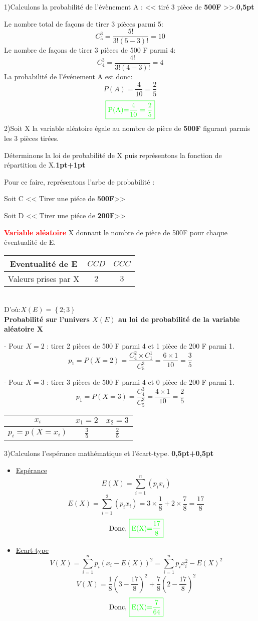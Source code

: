 \documentclass[12pt]{article}
\begin{document}
1)Calculons la probabilité de l'évènement A : << tiré 3 pièce de \textbf{500F} >>.\textbf{0,5pt}

Le nombre total de façons de tirer 3 pièces parmi 5:
\[
C_{5}^{3} = \frac{5!}{3!(5-3)!} = 10
\]
Le nombre de façons de tirer 3 pièces de 500 F parmi 4:
\[
C_{4}^{3} = \frac{4!}{3!(4-3)!} = 4
\]
La probabilité de l'événement A est donc:
\[
P(A) = \frac{4}{10} = \frac{2}{5}
\]
\[\color{green}{\boxed{\text{P(A)=}\frac{4}{10} = \frac{2}{5}}}\]
2)Soit X la variable aléatoire égale au nombre de pièce de \textbf{500F} figurant parmis les 3 pièces tirées.

Déterminons la loi de probabilité de X puis représentons la fonction de répartition de X.\textbf{1pt+1pt}

Pour ce faire, représentons l'arbe de probabilité :
 
Soit C << Tirer une piéce de \textbf{500F}>>

Soit D << Tirer une piéce de \textbf{200F}>>

\textbf{\textcolor{red}{Variable aléatoire}} X donnant le nombre de pièce de 500F pour chaque éventualité de E.

\begin{tabular}{|c|c|c|}
\hline
Eventualité de E & $CCD$ & $CCC$ \\
\hline
Valeurs prises par X &$2$ &$3$\\
\hline
\end{tabular}\\
D'où:$X(E) = \left\lbrace 2 ; 3 \right\rbrace $\\

\textbf{Probabilité sur l'univers $X(E)$ au loi de probabilité de la variable aléatoire X}

- Pour \(X = 2\) : tirer 2 pièces de 500 F parmi 4 et 1 pièce de 200 F parmi 1.
\[
p_{1}=P(X = 2) = \frac{C_{4}^{2} \times C_{1}^{1}}{C_{5}^{3}} = \frac{6 \times 1}{10} = \frac{3}{5}
\]

- Pour \(X = 3\) : tirer 3 pièces de 500 F parmi 4 et 0 pièce de 200 F parmi 1.
\[
p_{1}=P(X = 3) = \frac{C_{4}^{3}}{C_{5}^{3}} = \frac{4 \times 1}{10} = \frac{2}{5}
\]

\begin{tabular}{|c|c|c|}
\hline
$x_{i}$ & $x_{1}=2$ & $x_{2}=3$\\
\hline
$p_{i} = p(X = x_{i}) $ &$\frac{3}{5}$ &$\frac{2}{5}$ \\
\hline
\end{tabular}

3)Calculons l'espérance mathématique et l'écart-type. \textbf{0,5pt+0,5pt}
\begin{itemize}
\item \underline{Espérance}
\[E(X)=\sum_{i=1}^{n}(p_{i}x_{i})\]
\[E(X)=\sum_{i=1}^{2}(p_{i}x_{i})=3\times \frac{1}{8}+2\times \frac{7}{8}=\frac{17}{8}\]
\[\text{Donc, }\color{green}{\boxed{\text{E(X)=}\frac{17}{8}}}\]
\item \underline{Ecart-type}
\[V(X)=\sum_{i=1}^{n}p_{i}(x_{i}-E(X))^{2}=\sum_{i=1}^{n}p_{i}x_{i}^{2}-E(X)^{2}\]
\[V(X)=\frac{1}{8}\left( 3-\frac{17}{8}\right)^{2}+\frac{7}{8}\left( 2-\frac{17}{8}\right) ^{2}\]
\[\text{Donc, }\color{green}{\boxed{\text{E(X)=}\frac{7}{64}}}\]
\end{itemize}
\end{document}
